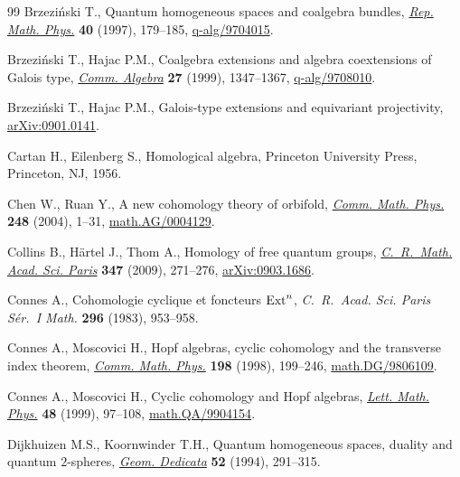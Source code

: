 \documentclass[pdftex]{sigma}
\numberwithin{equation}{section}
\begin{document}
\begin{thebibliography}{99}
Brzezi{\'n}ski T., Quantum homogeneous spaces and coalgebra bundles,
  \href{http://dx.doi.org/10.1016/S0034-4877(97)85914-9}{\textit{Rep. Math. Phys.}} \textbf{40} (1997), 179--185,
  \href{http://arxiv.org/abs/q-alg/9704015}{q-alg/9704015}.



Brzezi{\'n}ski T., Hajac P.M., Coalgebra extensions and algebra coextensions of
  {G}alois type, \href{http://dx.doi.org/10.1080/00927879908826498}{\textit{Comm. Algebra}} \textbf{27} (1999), 1347--1367,
  \href{http://arxiv.org/abs/q-alg/9708010}{q-alg/9708010}.

Brzezi{\'n}ski T., Hajac P.M., {G}alois-type extensions and equivariant
  projectivity, \href{http://arxiv.org/abs/0901.0141}{arXiv:0901.0141}.

Cartan H., Eilenberg S., Homological algebra, Princeton University Press,
  Princeton, NJ, 1956.

Chen W., Ruan Y., A new cohomology theory of orbifold, \href{http://dx.doi.org/10.1007/s00220-004-1089-4}{\textit{Comm. Math.
  Phys.}} \textbf{248} (2004), 1--31, \href{http://arxiv.org/abs/math.AG/0004129}{math.AG/0004129}.

Collins B., H{\"a}rtel J., Thom A., Homology of free quantum groups,
  \href{http://dx.doi.org/10.1016/j.crma.2009.01.021}{\textit{C.~R.~Math. Acad. Sci. Paris}} \textbf{347} (2009), 271--276,
  \href{http://arxiv.org/abs/0903.1686}{arXiv:0903.1686}.

Connes A., Cohomologie cyclique et foncteurs {${\rm Ext}^n$},
  \textit{C.~R.~Acad. Sci. Paris S\'er.~I Math.} \textbf{296} (1983), 953--958.

Connes A., Moscovici H., Hopf algebras, cyclic cohomology and the transverse
  index theorem, \href{http://dx.doi.org/10.1007/s002200050477}{\textit{Comm. Math. Phys.}} \textbf{198} (1998), 199--246,
  \href{http://arxiv.org/abs/math.DG/9806109}{math.DG/9806109}.

Connes A., Moscovici H., Cyclic cohomology and {H}opf algebras, \href{http://dx.doi.org/10.1023/A:1007527510226}{\textit{Lett.
  Math. Phys.}} \textbf{48} (1999), 97--108, \href{http://arxiv.org/abs/math.QA/9904154}{math.QA/9904154}.

Dijkhuizen M.S., Koornwinder T.H., Quantum homogeneous spaces, duality and
  quantum {$2$}-spheres, \href{http://dx.doi.org/10.1007/BF01278478}{\textit{Geom. Dedicata}} \textbf{52} (1994), 291--315.


\end{thebibliography}
\end{document}
